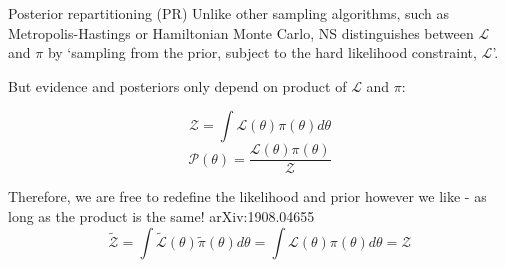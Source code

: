\documentclass[aspectratio=169]{beamer}
\def \bblock{\begin{beamerboxesrounded}[upper=uppercolor,lower=lowercolor,shadow=true]}
\def \eblock{\end{beamerboxesrounded}}
\begin{document}
\begin{frame}{Posterior repartitioning (PR)}
Unlike other sampling algorithms, such as Metropolis-Hastings or Hamiltonian Monte Carlo, NS distinguishes between $\mathcal{L}$ and $\pi$ by \alert{`sampling from the prior, subject to the hard likelihood constraint, $\mathcal{L}$'}.

But evidence and posteriors only depend on product of $\mathcal{L}$ and $\pi$: \vspace{-2em}
\begin{multicols}{2}
\begin{equation}
    \mathcal{Z} = \int \mathcal{L}(\theta) \pi(\theta) d\theta
\end{equation}\break
\begin{equation}
    \mathcal{P}(\theta) = \frac{\mathcal{L}(\theta)\pi(\theta)}{\mathcal{Z}}
\end{equation}
\end{multicols}
\bblock{Therefore, we are free to redefine the likelihood and prior however we like - as long as the product is the same! \textcolor{cfgrey}{arXiv:1908.04655}}
    \centering
    \begin{equation}
        \tilde{\mathcal{Z}} = \int \tilde{\mathcal{L}}(\theta) \tilde{\pi}(\theta) d\theta = \int \mathcal{L}(\theta) \pi(\theta) d\theta = \mathcal{Z}
    \end{equation}
\eblock
\end{frame}

\end{document}
